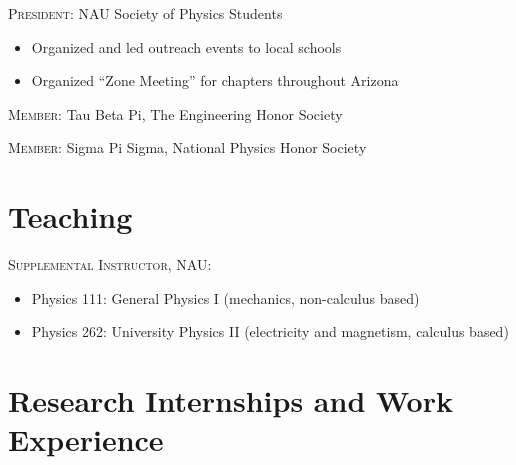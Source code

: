 \documentclass[letterpaper,10pt]{article} %
\begin{document}
\textsc{President:} NAU Society of Physics Students
\begin{itemize}
\item Organized and led outreach events to local schools
\item Organized ``Zone Meeting'' for chapters throughout Arizona
\end{itemize}

\textsc{Member:} Tau Beta Pi, The Engineering Honor Society

\textsc{Member:} Sigma Pi Sigma, National Physics Honor Society


\section*{Teaching}

\textsc{Supplemental Instructor, NAU:}
\begin{itemize}
\item Physics 111: General Physics I (mechanics, non-calculus based)
\item Physics 262: University Physics II (electricity and magnetism, calculus based)
\end{itemize}



\section{Research Internships and Work Experience}
\end{document}
